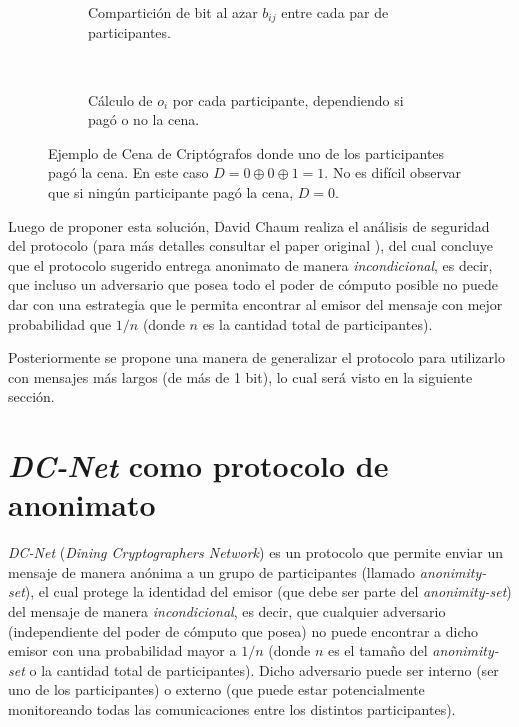 \begin{figure}[H]
\centering
\begin{subfigure}[b]{0.4\textwidth}
    
    \caption{Compartición de bit al azar $b_{ij}$ entre cada par de participantes.}
    \label{2a}
\end{subfigure}
~
\begin{subfigure}[b]{0.4\textwidth}
    
    \caption{Cálculo de $o_i$ por cada participante, dependiendo si pagó o no la cena.}
    \label{2b}
\end{subfigure}

\protect\caption{Ejemplo de Cena de Criptógrafos donde uno de los participantes pagó la cena. En este caso $D = 0 \oplus 0 \oplus 1 = 1$. 
No es difícil observar que si ningún participante pagó la cena, $D = 0$. }
\label{fig:example_dcnet_chaum}
\end{figure}

Luego de proponer esta solución, David Chaum realiza el análisis de seguridad del protocolo (para más detalles consultar el paper original 
\cite{chaum1988dining}), del cual concluye que el protocolo sugerido entrega anonimato de manera \emph{incondicional}, es decir, que incluso 
un adversario que posea todo el poder de cómputo posible no puede dar con una estrategia que le permita encontrar al emisor del mensaje 
con mejor probabilidad que $1/n$ (donde $n$ es la cantidad total de participantes).

Posteriormente se propone una manera de generalizar el protocolo para utilizarlo con mensajes más largos (de más de 1 bit), lo cual será 
visto en la siguiente sección.

\section{\emph{DC-Net} como protocolo de anonimato}

\emph{DC-Net} (\emph{Dining Cryptographers Network}) es un protocolo que permite enviar un mensaje de manera anónima a un grupo de participantes 
(llamado \emph{anonimity-set}), el cual protege la identidad del emisor (que debe ser parte del \emph{anonimity-set}) del mensaje de manera 
\emph{incondicional}, es decir, que cualquier adversario (independiente del poder de cómputo que posea) no puede encontrar a dicho emisor con 
una probabilidad mayor a $1/n$ (donde $n$ es el tamaño del \emph{anonimity-set} o la cantidad total de participantes). Dicho adversario puede 
ser interno (ser uno de los participantes) o externo (que puede estar potencialmente monitoreando todas las comunicaciones entre los distintos participantes).

